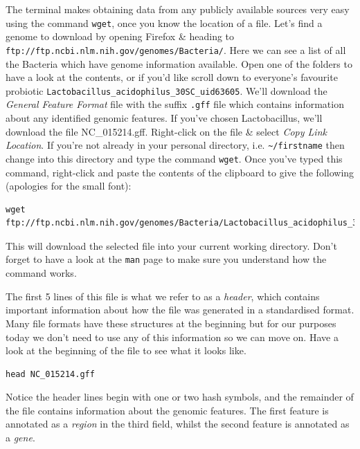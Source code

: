 \documentclass[a4paper,12pt,twoside]{memoir}
\begin{document}
\begin{steps}
The terminal makes obtaining data from any publicly available sources very easy using the command \texttt{wget}, once you know the location of a file.
Let's find a genome to download by opening Firefox \& heading to \texttt{ftp://ftp.ncbi.nlm.nih.gov/genomes/Bacteria/}.
Here we can see a list of all the Bacteria which have genome information available.
Open one of the folders to have a look at the contents, or if you'd like scroll down to everyone's favourite probiotic \texttt{Lactobacillus_acidophilus_30SC_uid63605}.
We'll download the \textit{General Feature Format} file with the suffix \texttt{.gff} file which contains information about any identified genomic features.
If you've chosen Lactobacillus, we'll download the file NC_015214.gff.
Right-click on the file \& select \textit{Copy Link Location}.
If you're not already in your personal directory, i.e. \texttt{\~{}/firstname} then change into this directory and type the command \texttt{wget}.
Once you've typed this command, right-click and paste the contents of the clipboard to give the following (apologies for the small font):
\end{steps}

\begin{lstlisting}[basicstyle=\tiny]
wget ftp://ftp.ncbi.nlm.nih.gov/genomes/Bacteria/Lactobacillus_acidophilus_30SC_uid63605/NC_015214.gff
\end{lstlisting}

This will download the selected file into your current working directory.
Don't forget to have a look at the \texttt{man} page to make sure you understand how the command works.

\begin{steps}
The first 5 lines of this file is what we refer to as a \textit{header}, which contains important information about how the file was generated in a standardised format.
Many file formats have these structures at the beginning but for our purposes today we don't need to use any of this information so we can move on.
Have a look at the beginning of the file to see what it looks like.
\end{steps}
\begin{lstlisting}
head NC_015214.gff
\end{lstlisting}

Notice the header lines begin with one or two hash symbols, and the remainder of the file contains information about the genomic features.
The first feature is annotated as a \textit{region} in the third field, whilst the second feature is annotated as a \textit{gene}.
\end{document}
